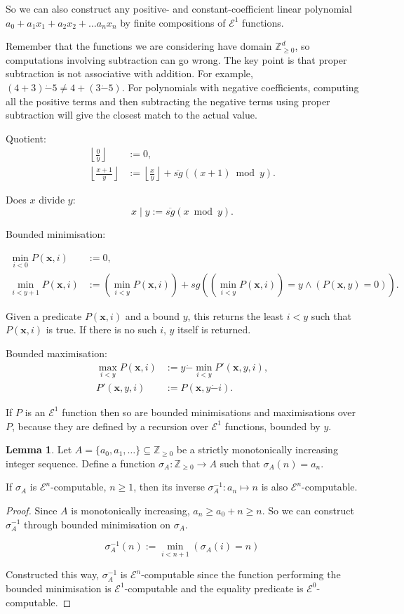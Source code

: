 \documentclass[a4paper]{article}
\newcommand{\grz}[1]{$\mathcal{E}^{#1}$}	%
\newcommand{\ZZ}{\mathbb{Z}}
\newcommand{\xvec}{\mathbf{x}}	%
\newcommand{\psub}{\dot -}	%
\newcommand{\rsg}{\overline{sg}} %
\newcommand{\recur}[1]{\begin{equation} \begin{split} #1 \end{split} \end{equation}}	%
\theoremstyle{plain}
\theoremstyle{definition}
\newtheorem{lemma}[theorem]{Lemma}
\begin{document}
	So we can also construct any positive- and constant-coefficient linear polynomial $a_0 + a_1x_1 + a_2x_2 + \dots a_nx_n$ by finite compositions of \grz{1} functions. 

Remember that the functions we are considering have domain $\ZZ_{\geq 0}^d$, so computations involving subtraction can go wrong. The key point is that proper subtraction is not associative with addition. For example, $(4+3) \psub 5 \neq 4+(3 \psub 5)$. For polynomials with negative coefficients, computing all the positive terms and then subtracting the negative terms using proper subtraction will give the closest match to the actual value.

Quotient:
\recur{
	\left \lfloor \frac{0}{y} \right \rfloor &:= 0, \\
	\left \lfloor \frac{x+1}{y} \right \rfloor &:= \left \lfloor \frac{x}{y} \right \rfloor + \rsg\left( (x+1) \bmod{y} \right).
}

Does $x$ divide $y$:
\begin{equation} x \mid y := \rsg( x \bmod{y} ). \end{equation}

Bounded minimisation: 

\recur{
	\min_{i < 0} P(\xvec,i) &:= 0,	\\
	\min_{i < y+1} P(\xvec,i) &:= \left( \min_{i  < y} P(\xvec,i) \right) + sg\left( (\min_{i<y}P(\xvec,i))=y \wedge (P(\xvec,y) = 0) \right).
}

Given a predicate $P(\xvec,i)$ and a bound $y$, this returns the least $i<y$ such that $P(\xvec,i)$ is true. If there is no such $i$, $y$ itself is returned.

Bounded maximisation:
\recur{
	\max_{i < y} P(\xvec,i) &:= y \psub \min_{i < y} P'(\xvec, y, i), \\
	P'(\xvec,y,i) &:= P(\xvec, y \psub i).
}

If $P$ is an \grz{1} function then so are bounded minimisations and maximisations over $P$, because they are defined by a recursion over \grz{1} functions, bounded by $y$.

\begin{lemma}
	Let $A = \{a_0, a_1, \dots\} \subseteq \ZZ_{\geq 0}$ be a strictly monotonically increasing integer sequence. Define a function $\sigma_A : \ZZ_{\geq 0} \to A$ such that $\sigma_A(n) = a_n$.
	
	If $\sigma_A$ is \grz{n}-computable, $n \geq 1$, then its inverse $\sigma_A^{-1} : a_n \mapsto n$ is also \grz{n}-computable. 
\end{lemma}
\begin{proof}
	Since $A$ is monotonically increasing, $a_n \geq a_0 + n \geq n$. So we can construct $\sigma_A^{-1}$ through bounded minimisation on $\sigma_A$.

	\[ \sigma_A^{-1}(n) := \min_{i < n+1}{\left( \sigma_A(i) = n \right)} \]

	Constructed this way, $\sigma_A^{-1}$ is \grz{n}-computable since the function performing the bounded minimisation is \grz{1}-computable and the equality predicate is \grz{0}-computable. 
\end{proof}
\end{document}
